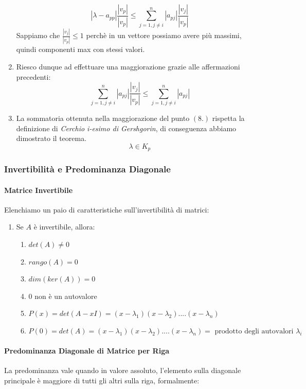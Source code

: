 \documentclass{article}
\begin{document}
\begin{enumerate}
    \[ |\lambda - a_{pp }|  \frac{|v_{p}|}{|v_{p}|} \leq \sum_{j=1,j \neq i}^{n} |a_{pj}| \frac{|v_{j}|}{|v_{p}|} \]
    Sappiamo che $\frac{|v_{j}|}{|v_{p}|} \leq 1$ perchè in un vettore possiamo avere più massimi, quindi componenti max con stessi valori.
    \item Riesco dunque ad effettuare una maggiorazione grazie alle affermazioni precedenti:
    \[ \sum_{j=1,j \neq i}^{n} |a_{pj}| \frac{|v_{j}|}{|v_{p}|} \leq \sum_{j=1,j \neq i}^{n} |a_{pj}| \]
    \item La sommatoria ottenuta nella maggiorazione del punto $(8.)$ rispetta la definizione di \textit{Cerchio i-esimo di Gershgorin}, di conseguenza abbiamo dimostrato il teorema. $\boxed{}$
    \[ \boxed{\lambda \in K_{p}} \]
    
\end{enumerate}

\subsubsection{Invertibilità e Predominanza Diagonale}

\paragraph{Matrice Invertibile} Elenchiamo un paio di caratteristiche sull'invertibilità di matrici:

\begin{enumerate}
    \item Se $A$ è invertibile, allora:
    \begin{enumerate}
        \item $det(A) \neq 0 $
        \item $rango(A) = 0$
        \item $dim(ker(A)) = 0$
        \item $0$ non è un autovalore
        \item $P(x) = det(A-xI) = (x-\lambda_{1})(x-\lambda_{2})....(x-\lambda_{n})$
        \item $P(0) = det(A) = (x-\lambda_{1})(x-\lambda_{2})....(x-\lambda_{n}) = \text{ prodotto degli autovalori }\lambda_{i}$
    \end{enumerate}
\end{enumerate}

\paragraph{Predominanza Diagonale di Matrice per Riga} La predominanza vale quando in valore assoluto, l'elemento sulla diagonale principale è maggiore di tutti gli altri sulla riga, formalmente:
\end{document}
